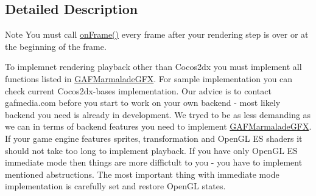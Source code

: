 \subsection{Detailed Description}
\begin{DoxyNote}{Note}
You must call \hyperlink{class_g_a_f_1_1_g_a_f_marmalade_g_f_x_a1c70fe78be6ca6ec191b38aa91c5fa44}{on\-Frame()} every frame after your rendering step is over or at the beginning of the frame.
\end{DoxyNote}
To implemnet rendering playback other than Cocos2dx you must implement all functions listed in \hyperlink{class_g_a_f_1_1_g_a_f_marmalade_g_f_x}{G\-A\-F\-Marmalade\-G\-F\-X}. For sample implementation you can check current Cocos2dx-\/bases implementation. Our advice is to contact gafmedia.\-com before you start to work on your own backend -\/ most likely backend you need is already in development. We tryed to be as less demanding as we can in terms of backend features you need to implement \hyperlink{class_g_a_f_1_1_g_a_f_marmalade_g_f_x}{G\-A\-F\-Marmalade\-G\-F\-X}. If your game engine features sprites, transformation and Open\-G\-L E\-S shaders it should not take too long to implement playback. If you have only Open\-G\-L E\-S immediate mode then things are more diffictult to you -\/ you have to implement mentioned abstructions. The most important thing with immediate mode implementation is carefully set and restore Open\-G\-L states. 


